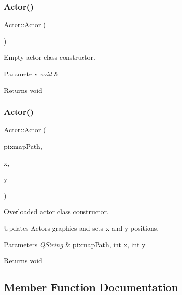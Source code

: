 \subsubsection{\texorpdfstring{Actor()}{Actor()}\hspace{0.1cm}{\footnotesize\ttfamily [1/2]}}
{\footnotesize\ttfamily Actor\+::\+Actor (\begin{DoxyParamCaption}{ }\end{DoxyParamCaption})}



Empty actor class constructor. 


\begin{DoxyParams}{Parameters}
{\em void} & \\
\hline
\end{DoxyParams}
\begin{DoxyReturn}{Returns}
void 
\end{DoxyReturn}
\mbox{\label{class_actor_a651899b4ab39be662d785c298a2a2fae}} 
\subsubsection{\texorpdfstring{Actor()}{Actor()}\hspace{0.1cm}{\footnotesize\ttfamily [2/2]}}
{\footnotesize\ttfamily Actor\+::\+Actor (\begin{DoxyParamCaption}\item[{Q\+String}]{pixmap\+Path,  }\item[{int}]{x,  }\item[{int}]{y }\end{DoxyParamCaption})}



Overloaded actor class constructor. 

Updates Actors graphics and sets x and y positions. 
\begin{DoxyParams}{Parameters}
{\em Q\+String} & pixmap\+Path, int x, int y \\
\hline
\end{DoxyParams}
\begin{DoxyReturn}{Returns}
void 
\end{DoxyReturn}


\subsection{Member Function Documentation}
\mbox{\label{class_actor_aa24a5fe0a46ca8274d993f7fe2954aa5}} 
